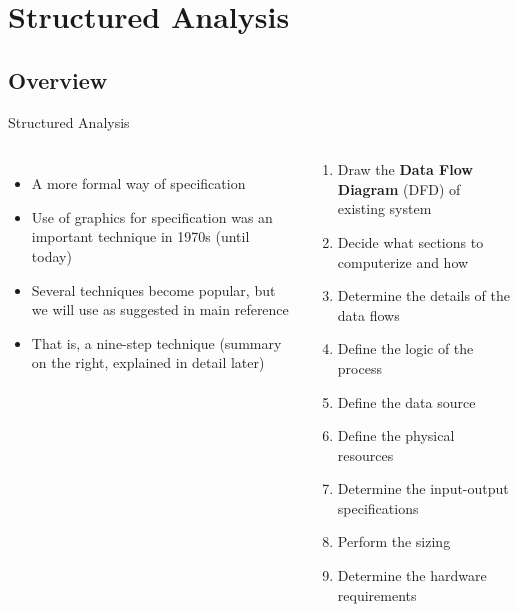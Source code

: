 \documentclass{beamer}
\begin{document}
	\section{Structured Analysis}
	\subsection{Overview}
	\begin{frame}{Structured Analysis}
		\begin{columns}[t,totalwidth=\textwidth]
				\begin{itemize}
					\item A more formal way of specification
					\item Use of graphics for specification was an important technique in 1970s (until today)
					\item Several techniques become popular, but we will use \cite{gane1977structured} as suggested in main reference
					\item That is, a nine-step technique (summary on the right, explained in detail later)
				\end{itemize}
			\begin{flushright}
				\small{
					\begin{enumerate}
						\item Draw the \textbf{Data Flow Diagram} (DFD) of existing system
						\item Decide what sections to computerize and how
						\item Determine the details of the data flows
						\item Define the logic of the process
						\item Define the data source
						\item Define the physical resources
						\item Determine the input-output specifications
						\item Perform the sizing
						\item Determine the hardware requirements
					\end{enumerate}
				}
			\end{flushright}
		\end{columns}		
	\end{frame}
\end{document}
